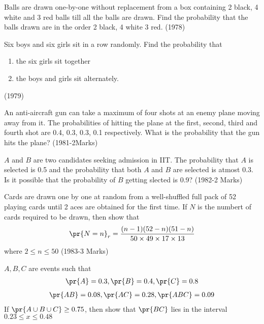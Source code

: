 \iffalse
\title{Assignment}
\author{Y.Harsha Vardhan Reddy}
\section{subjective}
\fi
    \item Balls are drawn one-by-one without replacement from a box containing 2 black, 4 white and 3 red balls till all the balls are drawn. Find the probability that the balls drawn are in the order 2 black, 4 white 3 red.
    \hfill{(1978)}

    \item Six boys and six girls sit in a row randomly. Find the probability that \\
    \begin{enumerate}
    \item the six girls sit together \\
    \item the boys and girls sit alternately.
    \end{enumerate}
    \hfill{(1979)}
    \item An anti-aircraft gun can take a maximum of four shots at an enemy plane moving away from it. The probabilities of hitting the plane at the first, second, third and fourth shot are 0.4, 0.3, 0.3, 0.1 respectively. What is the probability that the gun hits the plane?
    \hfill{(1981-2Marks) }
    \item $A$ and $B$ are two candidates seeking admission in IIT. The probability that $A$ is selected is 0.5 and the probability that both $A$ and $B$ are selected is atmost 0.3. Is it possible that the probability of $B$ getting slected is 0.9?
    \hfill{(1982-2 Marks)}



\item Cards are drawn one by one at random from a well-shuffled full pack of 52 playing cards until 2 aces are obtained for the first time. If $N$ is the numbert of cards required to be drawn, then show that \begin{align*}
        \pr{N=n}_r=\frac{(n-1)(52-n)(51-n)}{50\times49\times17\times13} 
    \end{align*} where $2\le n\le 50$
    \hfill{(1983-3 Marks)}
    \item $A,B,C$ are events such that \begin{align*} \pr{A}=0.3, \pr{B}=0.4, \pr{C}=0.8 \end{align*} \begin{align*}\pr{AB}=0.08, \pr{AC}=0.28, \pr{ABC}=0.09 \end{align*} If $\pr{A \cup B \cup C}\ge 0.75$, then show that $\pr{BC}$ lies in the interval $0.23 \le x \le 0.48$
        
